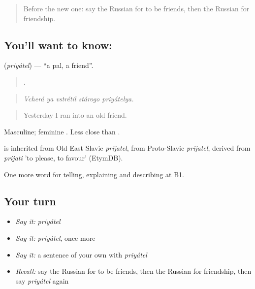 \begin{quote}
Before the new one: say the Russian for to be friends, then the Russian for friendship.
\end{quote}

\subsection*{You'll want to know: }
\textbf{} (\emph{priyátel}) — \textquotedblleft{}a pal, a friend\textquotedblright{}.

\begin{quote}
    .
\end{quote}

\begin{quote}
\emph{Vcherá ya vstrétil stárogo priyátelya.}
\end{quote}

\begin{quote}
Yesterday I ran into an old friend.
\end{quote}

Masculine; feminine . Less close than \emph{}.

\begin{cousinweb}
\emph{} is inherited from Old East Slavic \emph{prijatel}, from Proto-Slavic \emph{prijateľ}, derived from \emph{prijati} 'to please, to favour' (EtymDB).
\end{cousinweb}

\begin{grammarlens}[title={What you've built}]
One more word for telling, explaining and describing at B1.
\end{grammarlens}

\subsection*{Your turn}
\begin{itemize}
\raggedright
  \item \emph{Say it:} \emph{priyátel}
  \item \emph{Say it:} \emph{priyátel}, once more
  \item \emph{Say it:} a sentence of your own with \emph{priyátel}
  \item \emph{Recall:} say the Russian for to be friends, then the Russian for friendship, then say \emph{priyátel} again
\end{itemize}

